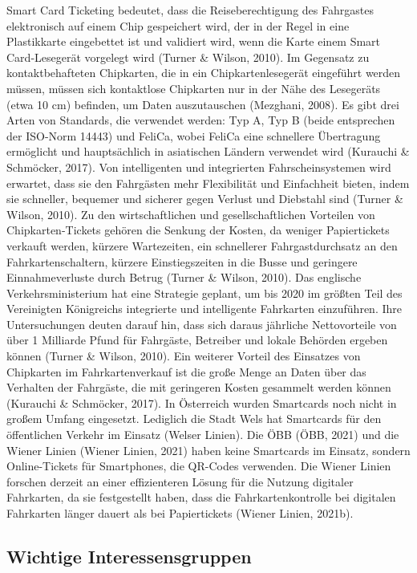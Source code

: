 \documentclass[
]{book}
\begin{document}
Smart Card Ticketing bedeutet, dass die Reiseberechtigung des Fahrgastes elektronisch auf einem Chip gespeichert wird, der in der Regel in eine Plastikkarte eingebettet ist und validiert wird, wenn die Karte einem Smart Card-Lesegerät vorgelegt wird (Turner \& Wilson, 2010). Im Gegensatz zu kontaktbehafteten Chipkarten, die in ein Chipkartenlesegerät eingeführt werden müssen, müssen sich kontaktlose Chipkarten nur in der Nähe des Lesegeräts (etwa 10 cm) befinden, um Daten auszutauschen (Mezghani, 2008). Es gibt drei Arten von Standards, die verwendet werden: Typ A, Typ B (beide entsprechen der ISO-Norm 14443) und FeliCa, wobei FeliCa eine schnellere Übertragung ermöglicht und hauptsächlich in asiatischen Ländern verwendet wird (Kurauchi \& Schmöcker, 2017).
Von intelligenten und integrierten Fahrscheinsystemen wird erwartet, dass sie den Fahrgästen mehr Flexibilität und Einfachheit bieten, indem sie schneller, bequemer und sicherer gegen Verlust und Diebstahl sind (Turner \& Wilson, 2010). Zu den wirtschaftlichen und gesellschaftlichen Vorteilen von Chipkarten-Tickets gehören die Senkung der Kosten, da weniger Papiertickets verkauft werden, kürzere Wartezeiten, ein schnellerer Fahrgastdurchsatz an den Fahrkartenschaltern, kürzere Einstiegszeiten in die Busse und geringere Einnahmeverluste durch Betrug (Turner \& Wilson, 2010).
Das englische Verkehrsministerium hat eine Strategie geplant, um bis 2020 im größten Teil des Vereinigten Königreichs integrierte und intelligente Fahrkarten einzuführen. Ihre Untersuchungen deuten darauf hin, dass sich daraus jährliche Nettovorteile von über 1 Milliarde Pfund für Fahrgäste, Betreiber und lokale Behörden ergeben können (Turner \& Wilson, 2010).
Ein weiterer Vorteil des Einsatzes von Chipkarten im Fahrkartenverkauf ist die große Menge an Daten über das Verhalten der Fahrgäste, die mit geringeren Kosten gesammelt werden können (Kurauchi \& Schmöcker, 2017). In Österreich wurden Smartcards noch nicht in großem Umfang eingesetzt. Lediglich die Stadt Wels hat Smartcards für den öffentlichen Verkehr im Einsatz (Welser Linien). Die ÖBB (ÖBB, 2021) und die Wiener Linien (Wiener Linien, 2021) haben keine Smartcards im Einsatz, sondern Online-Tickets für Smartphones, die QR-Codes verwenden. Die Wiener Linien forschen derzeit an einer effizienteren Lösung für die Nutzung digitaler Fahrkarten, da sie festgestellt haben, dass die Fahrkartenkontrolle bei digitalen Fahrkarten länger dauert als bei Papiertickets (Wiener Linien, 2021b).

\hypertarget{wichtige-interessensgruppen-26}{%
\subsection*{Wichtige Interessensgruppen}\label{wichtige-interessensgruppen-26}}
\end{document}
